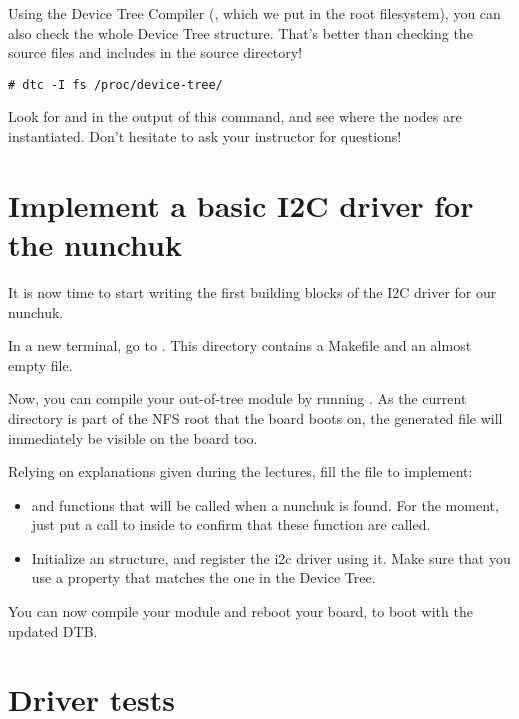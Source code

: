 Using the Device Tree Compiler (, which we put in the root
filesystem), you can also check the whole Device Tree structure. That's
better than checking the source files and includes in the source
directory!

\begin{verbatim}
# dtc -I fs /proc/device-tree/
\end{verbatim}

Look for  and  in the output of this command,
and see where the nodes are instantiated. Don't hesitate to ask your
instructor for questions!

\section{Implement a basic I2C driver for the nunchuk}

It is now time to start writing the first building blocks of the I2C
driver for our nunchuk.

In a new terminal, go to
.  This directory
contains a Makefile and an almost empty  file.

Now, you can compile your out-of-tree module by running . As
the current directory is part of the NFS root that the board boots on,
the generated  file will immediately be visible on the board
too.

Relying on explanations given during the lectures, fill the
 file to implement:

\begin{itemize}
\item {} and  functions that will
      be called when a nunchuk is found.
      For the moment, just put a call to  inside
      to confirm that these function are called.
\item Initialize an  structure, and register
      the i2c driver using it. Make sure that you use
      a  property that matches the one in the
      Device Tree.
\end{itemize}

You can now compile your module and reboot your board, to
boot with the updated DTB.

\section{Driver tests}

